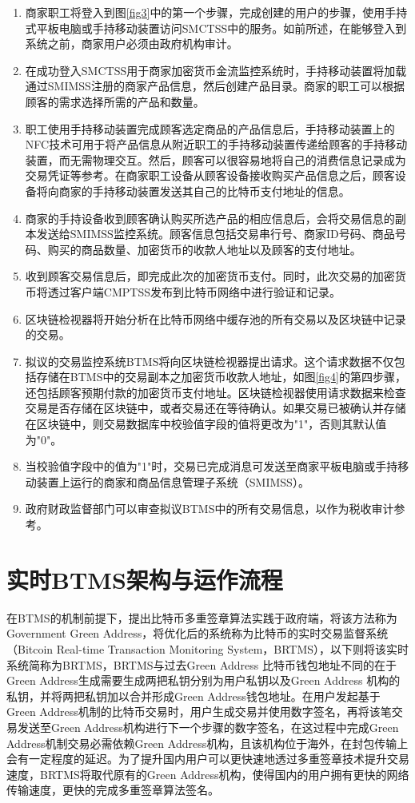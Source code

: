 		\begin{enumerate}
			\item 商家职工将登入到图\ref{fig3}中的第一个步骤，完成创建的用户的步骤，使用手持式平板电脑或手持移动装置访问SMCTSS中的服务。如前所述，在能够登入到系统之前，商家用户必须由政府机构审计。
			\item 在成功登入SMCTSS用于商家加密货币金流监控系统时，手持移动装置将加载通过SMIMSS注册的商家产品信息，然后创建产品目录。商家的职工可以根据顾客的需求选择所需的产品和数量。

			\item 职工使用手持移动装置完成顾客选定商品的产品信息后，手持移动装置上的NFC技术可用于将产品信息从附近职工的手持移动装置传递给顾客的手持移动装置，而无需物理交互。然后，顾客可以很容易地将自己的消费信息记录成为交易凭证等参考。在商家职⼯设备从顾客设备接收购买产品信息之后，顾客设备将向商家的手持移动装置发送其自己的比特币支付地址的信息。
			\item 商家的手持设备收到顾客确认购买所选产品的相应信息后，会将交易信息的副本发送给SMIMSS监控系统。顾客信息包括交易串行号、商家ID号码、商品号码、购买的商品数量、加密货币的收款人地址以及顾客的支付地址。
			\item 收到顾客交易信息后，即完成此次的加密货币支付。同时，此次交易的加密货币将透过客户端CMPTSS发布到比特币网络中进行验证和记录。
			\item 区块链检视器将开始分析在比特币网络中缓存池的所有交易以及区块链中记录的交易。
			\item 拟议的交易监控系统BTMS将向区块链检视器提出请求。这个请求数据不仅包括存储在BTMS中的交易副本之加密货币收款人地址，如图\ref{fig4}的第四步骤，还包括顾客预期付款的加密货币支付地址。区块链检视器使用请求数据来检查交易是否存储在区块链中，或者交易还在等待确认。如果交易已被确认并存储在区块链中，则交易数据库中校验值字段的值将更改为"1"，否则其默认值为"0"。
			\item 当校验值字段中的值为"1"时，交易已完成消息可发送至商家平板电脑或⼿持移动装置上运行的商家和商品信息管理子系统（SMIMSS）。
			\item 政府财政监督部门可以审查拟议BTMS中的所有交易信息，以作为税收审计参考。
		\end{enumerate}

\section{实时BTMS架构与运作流程}

		在BTMS的机制前提下，提出比特币多重签章算法实践于政府端，将该方法称为Government Green Address，将优化后的系统称为比特币的实时交易监督系统（Bitcoin Real-time Transaction Monitoring System，BRTMS），以下则将该实时系统简称为BRTMS，BRTMS与过去Green Address 比特币钱包地址不同的在于Green Address生成需要生成两把私钥分别为用户私钥以及Green Address 机构的私钥，并将两把私钥加以合并形成Green Address钱包地址。在用户发起基于Green Address机制的比特币交易时，用户生成交易并使用数字签名，再将该笔交易发送至Green Address机构进行下一个步骤的数字签名，在这过程中完成Green Address机制交易必需依赖Green Address机构，且该机构位于海外，在封包传输上会有一定程度的延迟。为了提升国内用户可以更快速地透过多重签章技术提升交易速度，BRTMS将取代原有的Green Address机构，使得国内的用户拥有更快的网络传输速度，更快的完成多重签章算法签名。 

